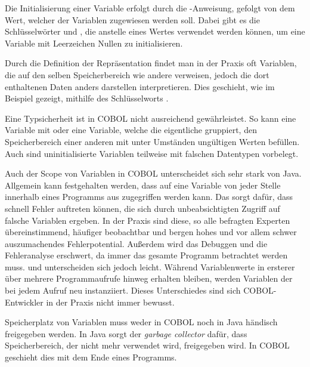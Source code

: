 Die Initialisierung einer Variable erfolgt durch die -Anweisung, gefolgt von dem Wert, welcher der Variablen zugewiesen werden soll. Dabei gibt es die Schlüsselwörter  \bzw {} und  \bzw {}, die anstelle eines Wertes verwendet werden können, um eine Variable mit Leerzeichen \bzw Nullen zu initialisieren.

Durch die Definition der Repräsentation findet man in der Praxis oft Variablen, die auf den selben Speicherbereich wie andere verweisen, jedoch die dort enthaltenen Daten anders darstellen \bzw interpretieren. Dies geschieht, wie im Beispiel gezeigt, mithilfe des Schlüsselworts .

Eine Typsicherheit ist in COBOL nicht ausreichend gewährleistet. So kann eine Variable mit  oder eine Variable, welche die eigentliche gruppiert, den Speicherbereich einer anderen mit unter Umständen ungültigen Werten befüllen. Auch sind uninitialisierte Variablen teilweise mit falschen Datentypen vorbelegt. 

Auch der Scope von Variablen in COBOL unterscheidet sich sehr stark von Java. Allgemein kann festgehalten werden, dass auf eine Variable von jeder Stelle innerhalb eines Programms aus zugegriffen werden kann. Das sorgt dafür, dass schnell Fehler auftreten können, die sich durch unbeabsichtigten Zugriff auf falsche Variablen ergeben. In der Praxis sind diese, so alle befragten Experten übereinstimmend, häufiger beobachtbar und bergen hohes und vor allem schwer auszumachendes Fehlerpotential. Außerdem wird das Debuggen und die Fehleranalyse erschwert, da immer das gesamte Programm betrachtet werden muss.  und  unterscheiden sich jedoch leicht. Während Variablenwerte in ersterer über mehrere Programmaufrufe hinweg erhalten bleiben, werden Variablen der  bei jedem Aufruf neu instanziiert. Dieses Unterschiedes sind sich COBOL-Entwickler in der Praxis nicht immer bewusst.

Speicherplatz von Variablen muss weder in COBOL noch in Java händisch freigegeben werden. In Java sorgt der \textit{garbage collector} dafür, dass Speicherbereich, der nicht mehr verwendet wird, freigegeben wird. In COBOL geschieht dies mit dem Ende eines Programms. 